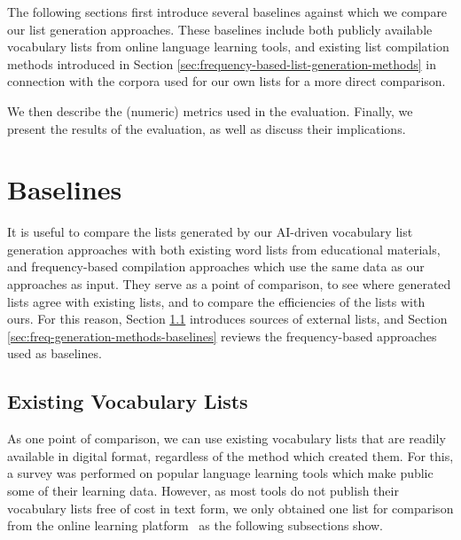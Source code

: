 
The following sections first introduce several baselines against which we compare our list generation approaches.
These baselines include both publicly available vocabulary lists from online language learning tools, and existing list compilation methods introduced in Section \ref{sec:frequency-based-list-generation-methods} in connection with the corpora used for our own lists for a more direct comparison.

We then describe the (numeric) metrics used in the evaluation.
Finally, we present the results of the evaluation, as well as discuss their implications.

\section{Baselines}
It is useful to compare the lists generated by our AI-driven vocabulary list generation approaches with both existing word lists from educational materials, and frequency-based compilation approaches which use the same data as our approaches as input.
They serve as a point of comparison, to see where generated lists agree with existing lists, and to compare the efficiencies of the lists with ours.
For this reason, Section \ref{sec:exising-lists} introduces sources of external lists, and Section \ref{sec:freq-generation-methods-baselines} reviews the frequency-based approaches used as baselines.

\subsection{Existing Vocabulary Lists} \label{sec:exising-lists}
As one point of comparison, we can use existing vocabulary lists that are readily available in digital format, regardless of the method which created them.
For this, a survey was performed on popular language learning tools which make public some of their learning data.
However, as most tools do not publish their vocabulary lists free of cost in text form, we only obtained one list for comparison from the online learning platform \Rosetta\, as the following subsections show.

